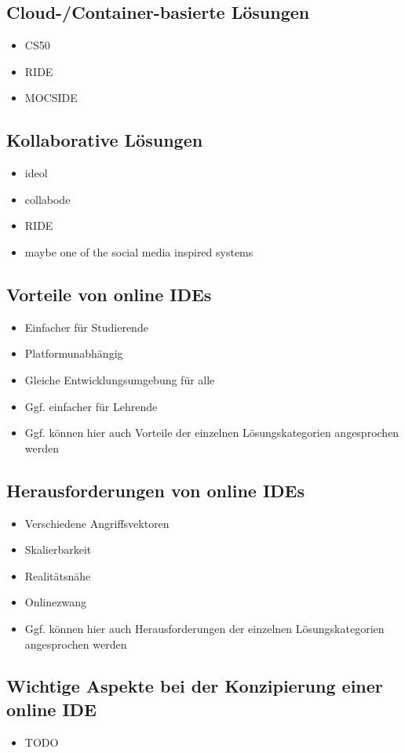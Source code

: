 \subsection{Cloud-/Container-basierte Lösungen} \label{cloud-container-based-approaches}

\begin{itemize}
    \item CS50
    \item RIDE
    \item MOCSIDE
\end{itemize}

\subsection{Kollaborative Lösungen} \label{collaborative-approaches}

\begin{itemize}
    \item ideol
    \item collabode
    \item RIDE
    \item maybe one of the social media inspired systems
\end{itemize}

\subsection{Vorteile von online IDEs} \label{advantages-online-ides}

\begin{itemize}
    \item Einfacher für Studierende
    \item Platformunabhängig
    \item Gleiche Entwicklungsumgebung für alle
    \item Ggf. einfacher für Lehrende
    \item Ggf. können hier auch Vorteile der einzelnen Lösungskategorien angesprochen werden
\end{itemize}

\subsection{Herausforderungen von online IDEs} \label{challenges-online-ides}

\begin{itemize}
    \item Verschiedene Angriffsvektoren
    \item Skalierbarkeit
    \item Realitätsnähe
    \item Onlinezwang
    \item Ggf. können hier auch Herausforderungen der einzelnen Lösungskategorien angesprochen werden
\end{itemize}

\subsection{Wichtige Aspekte bei der Konzipierung einer online IDE}

\begin{itemize}
    \item TODO
\end{itemize}